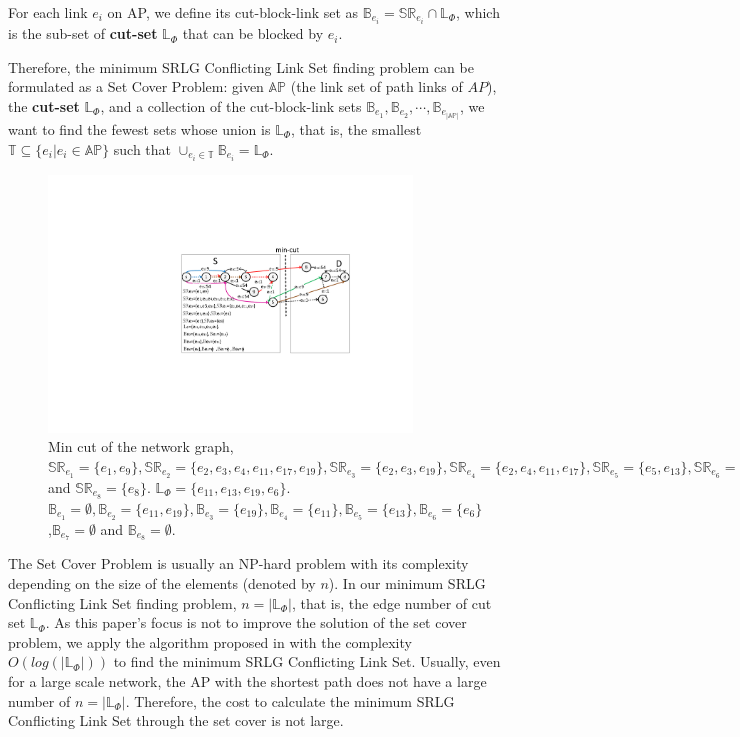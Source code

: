 For each link $e_i$ on AP, we define its cut-block-link set as ${\mathbb{B}_{{e_i}}} = \mathbb{SR}_{{e_i}} \cap \mathbb{L}_{\Phi}$, which is the sub-set of \textbf{cut-set} $\mathbb{L}_{\Phi}$ that can be blocked by $e_i$.

Therefore, the minimum SRLG Conflicting Link Set finding problem can be formulated as a Set Cover Problem: given $\mathbb{AP}$ (the link set of path links of $AP$), the \textbf{cut-set} $\mathbb{L}_{\Phi}$,  and a collection of the cut-block-link sets ${\mathbb{B}_{{e_1}}},{\mathbb{B}_{{e_2}}}, \cdots ,{\mathbb{B}_{{e_{|\mathbb{AP}|}}}}$, we want to find the fewest sets whose union is $\mathbb{L}_{\Phi}$, that is, the smallest $\mathbb{T} \subseteq \{e_i| e_i\in \mathbb{AP}\}$ such that ${ \cup_{e_i \in \mathbb{T}}}{\mathbb{B}_{e_i}} = \mathbb{L}_{\Phi}$.

\begin{figure}[tp]
  \centering
  \includegraphics[width=3.8in]{franz/MinCutStarGraph}
  \caption{Min cut of the network graph, $\mathbb{SR}_{e_1}=\{e_1, e_9\},\mathbb{SR}_{e_2}=\{e_2,e_3,e_4, e_{11},e_{17},e_{19}\},\mathbb{SR}_{e_3}=\{e_2,e_3, e_{19}\},\mathbb{SR}_{e_4}=\{e_2,e_4, e_{11},e_{17}\},\mathbb{SR}_{e_5}=\{e_5, e_{13}\},\mathbb{SR}_{e_6}=\{e_6\},\mathbb{SR}_{e_7}=\{e_7\} $ and $\mathbb{SR}_{e_8}=\{e_8\}$. $\mathbb{L}_{\Phi}=\{e_{11},e_{13},e_{19},e_{6}\}$. $\mathbb{B}_{e_1}=\emptyset,\mathbb{B}_{e_2}=\{e_{11},e_{19}\},\mathbb{B}_{e_3}=\{e_{19}\},\mathbb{B}_{e_4}=\{e_{11}\},\mathbb{B}_{e_5}=\{e_{13}\},\mathbb{B}_{e_6}=\{e_6\}$,$\mathbb{B}_{e_7}=\emptyset$ and $\mathbb{B}_{e_8}=\emptyset$.}\label{fig:MinCutStarGraph}
  \label{fig:MinCutStarGraph}
\end{figure}

The Set Cover Problem is usually an NP-hard problem with its complexity depending on the size of the elements (denoted by $n$). In our minimum SRLG Conflicting Link Set finding problem, $n=|\mathbb{L}_{\Phi}|$, that is, the edge number of cut set $\mathbb{L}_{\Phi}$. As this paper's focus is not to improve the solution of the set cover problem, we apply the algorithm proposed in \cite{chvatal1979greedy} with the complexity $O(log(|\mathbb{L}_{\Phi}|))$  to find the minimum SRLG Conflicting Link Set. Usually, even for a large scale network, the  AP with the shortest path does not have a large number of $n=|\mathbb{L}_{\Phi}|$. Therefore, the cost to calculate the minimum SRLG Conflicting Link Set through the set cover is not large.

